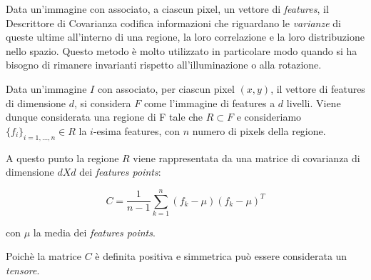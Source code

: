 Data un'immagine con associato, a ciascun pixel, un vettore di \emph{features}, il Descrittore di Covarianza codifica informazioni che riguardano le \emph{varianze} di queste ultime all'interno di una regione, la loro correlazione e la loro distribuzione nello spazio. Questo metodo è molto utilizzato in particolare modo quando si ha bisogno di rimanere invarianti rispetto all'illuminazione o alla rotazione.

Data un'immagine $I$ con associato, per ciascun pixel $(x, y)$, il vettore di features di dimensione $d$, si considera $F$ come l'immagine di features a $d$ livelli. Viene dunque considerata una regione di F tale che $R \subset F$ e consideriamo $\{f_i\}_{i = 1,\ldots, n} \in R$ la $i$-esima features, con $n$ numero di pixels della regione.

A questo punto la regione $R$ viene rappresentata da una matrice di covarianza di dimensione $d X d$ dei \emph{features points}:

$$C = \frac{1}{n -1} \sum_{k = 1}^{n} (f_k - \mu)(f_k - \mu)^T$$

con $\mu$ la media dei \emph{features points}.

Poichè la matrice $C$ è definita positiva e simmetrica può essere considerata un \emph{tensore}.


